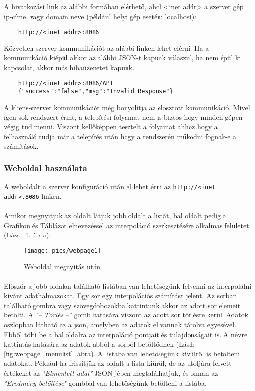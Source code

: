 	\newline A hivatkozási link az alábbi formában elérhető, ahol <inet addr> a szerver gép ip-címe, vagy domain neve (például helyi gép esetén: localhost):  
	\begin{verbatim}
	http://<inet addr>:8086
	\end{verbatim}
	Közvetlen szerver kommunikációt az alábbi linken lehet elérni. 
	Ha a kommunikáció kiépül akkor az alábbi JSON-t kapunk válaszul, ha nem épül ki kapcsolat, akkor más hibaüzenetet kapunk. 
	\begin{verbatim}
	http://<inet addr>:8086/API 
	{"success":"false","msg":"Invalid Response"}
	\end{verbatim}
	A kliens-szerver kommunikációt még bonyolítja az elosztott kommunikáció.
	Mivel igen sok rendszert érint, a telepítési folyamat nem is biztos hogy minden gépen végig tud menni. \newline
	Viszont kellőképpen tesztelt a folyamat ahhoz hogy a felhasználó tudja már a telepítés után hogy a rendszerén működni fognak-e a számítások.
\subsubsection{Weboldal használata}
	A weboldalt a szerver konfiguráció után el lehet érni az \texttt{http://<inet addr>:8086} linken.

	\paragraph{}
	Amikor megnyitjuk az oldalt látjuk jobb oldalt a listát, bal oldalt pedig a Grafikon és Táblázat elnevezéssel az interpoláció szerkesztésére alkalmas felületet
	(Lásd: \ref{fig:webpage1}. ábra).

	\begin{figure}[h]
		\texttt{[image: pics/webpage1]}
		\centering
		\caption{Weboldal megnyitás után\label{fig:webpage1}}
	\end{figure}

	\paragraph{}
	Először a jobb oldalon található listában van lehetőségünk felvenni az interpolálni kívánt adathalmazokat. Egy sor egy interpolációs számítást jelent. Az sorban található gombra vagy szövegdobozokba kattintunk akkor az adott sor elemeit betölti.
	A \textit{"-- Törlés --"} gomb hatására viszont az adott sor törlésre kerül. \newline
	Adatok oszlopban látható az a json, amelyben az adatok el vannak tárolva egyesével. Ebből tölti be a bal oldalra az interpoláció pontjait és tulajdonságait is. A névre kattintás hatására az adatok abból a sorból betöltődnek (Lásd: \ref{fig:webpage_menulist}. ábra). \newline 
	A listába van lehetőségünk kívülről is betölteni adatokat. Például ha frissítjük az oldalt a lista kiürül, de az utoljára felvett értékeket az \textit{"Elmentett adat"} JSON-jében megtalálhatjuk, és onnan az \textit{"Eredmény betöltése"} gombbal van lehetőségünk betölteni a listába.

